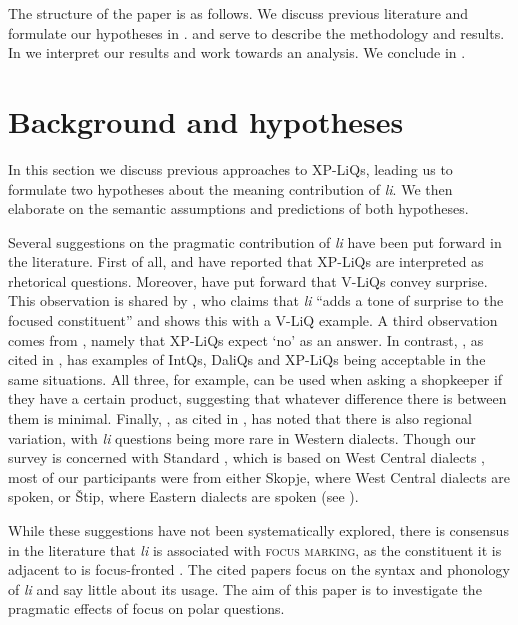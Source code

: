 \documentclass[output=paper,
colorlinks,
citecolor=brown,
newtxmath
]{langscibook}
\begin{document}
The structure of the paper is as follows. We discuss previous literature and formulate our hypotheses in .  and  serve to describe the methodology and results. In  we interpret our results and work towards an analysis. We conclude in .
\section{Background and hypotheses}\label{sec:back}

In this section we discuss previous approaches to XP-LiQs, leading us to formulate two hypotheses about the meaning contribution of \textit{li}. We then elaborate on the semantic assumptions and predictions of both hypotheses.

Several suggestions on the pragmatic contribution of \textit{li} have been put forward in the literature. First of all, \citet{minova1987} and \citet{Rudin.Kramer.Billings.Baerman1999} have reported that XP-LiQs are interpreted as rhetorical questions. Moreover, \citet{Rudin.Kramer.Billings.Baerman1999} have put forward that V-LiQs convey surprise. This observation is shared by \citet[137]{lazarova2003},  who claims that \textit{li} ``adds a tone of surprise to the focused constituent'' and shows this with a V-LiQ example. A third observation comes from \citet{englund1977}, namely that XP-LiQs expect `no' as an answer. In contrast, \citet{kramer1985}, as cited in \citet{Rudin.Kramer.Billings.Baerman1999}, has examples of IntQs, DaliQs and XP-LiQs being acceptable in the same situations. All three, for example, can be used when asking a shopkeeper if they have a certain product, suggesting that whatever difference there is between them is minimal. Finally, \citet{koneski1965}, as cited in \citet[128]{englund1977}, has noted that there is also regional variation, with \textit{li} questions being more rare in Western dialects. Though our survey is concerned with Standard , which is based on West Central dialects \citep{Friedman2001}, most of our participants were from either Skopje, where West Central dialects are spoken, or Štip, where Eastern dialects are spoken (see ).

While these suggestions have not been systematically explored, there is consensus in the literature that
\textit{li} is associated with \textsc{focus marking}, as the constituent it is adjacent to is focus-fronted \citep{Tomic1996a, Rudin.Kramer.Billings.Baerman1999,schwabe2004,lazarova2003}. The cited papers focus on the syntax and phonology of \textit{li} and say little about its usage. The aim of this paper is to investigate the pragmatic effects of focus on polar questions.
\end{document}
